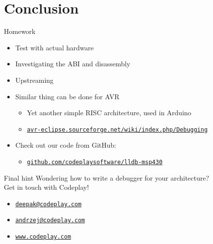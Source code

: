 \documentclass[t]{beamer}
\newcommand{\codeempha}[1]{\textcolor{uiorange}{#1}}
\begin{document}
\section*{Conclusion}

\begin{frame}{Homework}
\begin{itemize}
    \setlength\itemsep{1em}
    \item Test with actual \codeempha{hardware}
    \item Investigating the ABI and disassembly
    \item \codeempha{Upstreaming}
    \item Similar thing can be done for \codeempha{AVR}
    \begin{itemize}
        \setlength\itemsep{1em}
        \item Yet another simple RISC architecture, used in Arduino
        \item \href{http://avr-eclipse.sourceforge.net/wiki/index.php/Debugging}{\nolinkurl{avr-eclipse.sourceforge.net/wiki/index.php/Debugging}}
    \end{itemize}
    \item Check out our code from GitHub:
    \begin{itemize}
        \item \href{http://github.com/codeplaysoftware/lldb-msp430}{\nolinkurl{github.com/codeplaysoftware/lldb-msp430}}
    \end{itemize}
\end{itemize}
\end{frame}


\begin{frame}{Final hint}
\vspace{20pt}
\Large
Wondering how to write a debugger for your architecture? 
\vspace{1mm}
\quad \\ 
Get in touch with Codeplay!
    \begin{itemize}
        \setlength\itemsep{0.75em}
        \item \href{mailto:deepak@codeplay.com}{\nolinkurl{deepak@codeplay.com}}
        \item \href{mailto:andrzej@codeplay.com}{\nolinkurl{andrzej@codeplay.com}}
        \item \href{http://www.codeplay.com}{\nolinkurl{www.codeplay.com}}
    \end{itemize}

\end{frame}

\end{document}
